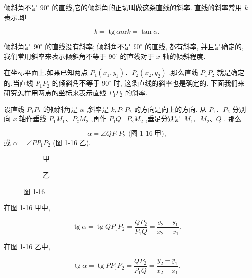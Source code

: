 \documentclass[lang=cn,newtx,10.5pt,scheme=chinese]{elegantbook}
\begin{document}
\begin{definition}[斜率]
  倾斜角不是 \({90}^{ \circ }\) 的直线,它的倾斜角的正切叫做这条直线的斜率. 直线的斜率常用 \(k\) 表示,即

\[
  k = \operatorname{tg}\alpha \text{or} k = \tan\alpha  \text{.}
\]

倾斜角是 \({90}^{ \circ }\) 的直线没有斜率; 倾斜角不是 \({90}^{ \circ }\) 的直线, 都有斜率, 并且是确定的, 我们常用斜率来表示倾斜角不等于 \({90}^{ \circ }\) 的直线对于 \(x\) 轴的倾斜程度.
\end{definition}

在坐标平面上,如果已知两点 \({P}_{1}\left( {{x}_{1},{y}_{1}}\right) \text{、}{P}_{2}\left( {{x}_{2},{y}_{2}}\right)\) ,那么直线 \({P}_{1}{P}_{2}\) 就是确定的,当直线 \({P}_{1}{P}_{2}\) 的倾斜角不等于 \({90}^{ \circ }\) 时, 这条直线的斜率也是确定的. 下面我们来研究怎样用两点的坐标来表示直线 \({P}_{1}{P}_{2}\) 的斜率.

设直线 \({P}_{1}{P}_{2}\) 的倾斜角是 \(\alpha\) ,斜率是 \(k,\overline{{P}_{1}{P}_{2}}\) 的方向是向上的方向. 从 \({P}_{1}\text{、}{P}_{2}\) 分别向 \(x\) 轴作垂线 \({P}_{1}{M}_{1}\text{、}{P}_{2}{M}_{2}\) ,再作 \({P}_{1}Q \bot {P}_{2}{M}_{2}\) ,垂足分别是 \({M}_{1}\text{、}{M}_{2}\text{、}Q\) . 那么

\[
  \alpha = \angle Q{P}_{1}{P}_{2}\text{ (图 1-16 甲),} 
\]
或 \(\alpha = \angle P{P}_{1}{P}_{2}\)  (图 1-16 乙).
\begin{figure}[h]
	\centering
	\begin{subfigure}[h]{0.45\textwidth}
		\centering
		
		\caption{甲}
	\end{subfigure}
	\hfill %
	\begin{subfigure}[h]{0.45\textwidth}
		\centering
		
		\caption{乙}
	\end{subfigure}
	\caption{图 1-16}
\end{figure}

在图 1-16 甲中,

\[
  \operatorname{tg}\alpha = \operatorname{tg}Q{P}_{1}{P}_{2} = \frac{Q{P}_{2}}{{P}_{1}Q} = \frac{{y}_{2} - {y}_{1}}{{x}_{2} - {x}_{1}}.
\]

在图 1-16 乙中,

\[
  \operatorname{tg}\alpha = \operatorname{tg}P{P}_{1}{P}_{2} = \frac{Q{P}_{2}}{{P}_{1}Q} = \frac{{y}_{2} - {y}_{1}}{{x}_{2} - {x}_{1}}.
\]
\end{document}

